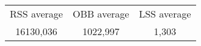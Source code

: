 \begin{tabular}{c|c|c}\\ 
RSS average & OBB average & LSS average\\ 
16130,036 & 1022,997 & 1,303\\ 
\end{tabular}